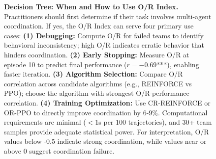 \begin{figure}[t]

\caption{\textbf{Decision Tree: When and How to Use O/R Index.}
Practitioners should first determine if their task involves multi-agent coordination. If yes, the O/R Index can serve four primary use cases: \textbf{(1) Debugging:} Compute O/R for failed teams to identify behavioral inconsistency; high O/R indicates erratic behavior that hinders coordination. \textbf{(2) Early Stopping:} Measure O/R at episode 10 to predict final performance ($r = -0.69$***), enabling faster iteration. \textbf{(3) Algorithm Selection:} Compare O/R correlation across candidate algorithms (e.g., REINFORCE vs PPO); choose the algorithm with strongest O/R-performance correlation. \textbf{(4) Training Optimization:} Use CR-REINFORCE or OR-PPO to directly improve coordination by 6-9\%. Computational requirements are minimal ($<$1s per 100 trajectories), and 30+ team samples provide adequate statistical power. For interpretation, O/R values below -0.5 indicate strong coordination, while values near or above 0 suggest coordination failure.}
\label{fig:decision_tree}
\end{figure}
